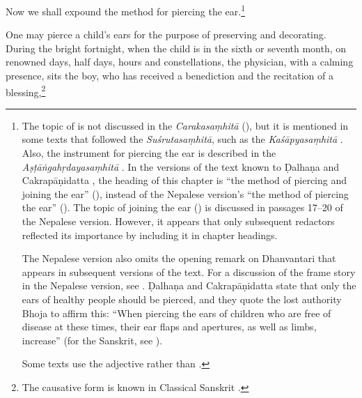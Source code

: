 \begin{translation}    
  
\item [1] 

Now we shall expound the method for piercing the ear.\footnote{The topic of 
     is not discussed in the \emph{Carakasaṃhitā}
    (\cite[IB, 326, n.\,175]{meul-hist}), but it is mentioned in some texts that
    followed the \emph{Suśrutasaṃhitā}, such as the \emph{Kaśāpyasaṃhitā} \citep[IIA,
    30]{meul-hist}. Also, the instrument for piercing the ear is described in the
    \emph{Aṣṭāṅgahṛdayasaṃhitā} . In the versions of the text known
    to Ḍalhaṇa \citep[76]{vulgate} and Cakrapāṇidatta \citep[125]{acar-1939}, the
    heading of this chapter is “the method of piercing and joining the ear”
    (), instead of the Nepalese version's “the method of
    piercing the ear” (). The topic of joining the ear
    () is discussed in passages 17--20 of the Nepalese version.
    However, it appears that only subsequent redactors reflected its importance by
    including it in chapter headings.

 The Nepalese version also omits the opening remark on Dhanvantari that appears in
subsequent versions of the text. For a discussion of the frame story in the
Nepalese version, see \cite{birc-2021}. Ḍalhaṇa \citep[76]{vulgate} and
Cakrapāṇidatta \citep[125]{acar-1939} state that only the ears of healthy people
should be pierced, and they quote the lost authority Bhoja to affirm this: “When
piercing the ears of children who are free of disease at these times, their ear
flaps and apertures, as well as limbs, increase” (for the Sanskrit, see
\cite[76]{vulgate}).

Some texts use the adjective  rather than .}

\item [2] 

One may pierce a child's ears for the purpose of preserving and decorating. During the
bright fortnight, when the child is in the sixth or seventh month, on renowned
days, half days, hours and constellations, the physician, with a calming presence,
sits the boy, who has received a benediction and the recitation of a
blessing,\footnote{The causative form  is known in Classical
    Sanskrit \citep[166]{whit-root}.

}
\end{translation}
